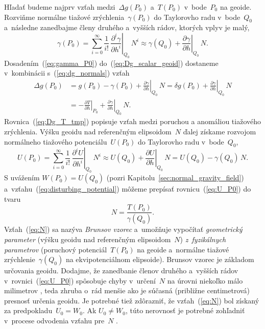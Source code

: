 \documentclass[a4paper, 12pt]{book}
\begin{document}
Hľadať budeme najprv vzťah medzi~$\Delta g(P_0)$ a~$T(P_0)$ v~bode~$P_0$ na 
geoide.  Rozviňme normálne tiažové zrýchlenia~$\gamma(P_0)$ do Taylorovho radu 
v~bode~$Q_0$ a~následne zanedbajme členy druhého a~vyšších rádov, ktorých vplyv 
je malý,
%
\begin{equation}
\label{eq:gamma_P0}
\gamma(P_0) = \sum_{i = 0}^\infty \frac{1}{i!} \, \left.\frac{\partial^i 
\gamma}{\partial h^i}\right|_{Q_0} \, N^i \approx \gamma(Q_0) 
+ \left.\frac{\partial \gamma}{\partial h}\right|_{Q_0} \, N{.}
\end{equation}
%
Dosadením~(\ref{eq:gamma_P0}) do~(\ref{eq:Dg_scalar_geoid}) dostaneme 
v~kombinácii s~(\ref{eq:dg_normals}) vzťah
%
\begin{equation}
\label{eq:Dg_T_tmp}
\begin{split}
\Delta g(P_0) &= g(P_0) - \gamma(P_0) + \left.\frac{\partial \gamma}{\partial 
h}\right|_{Q_0} \, N = \delta g(P_0) + \left.\frac{\partial \gamma}{\partial 
h}\right|_{Q_0} \, N\\
%
&=-\left.\frac{\partial T}{\partial h}\right|_{P_0} + \left.\frac{\partial 
\gamma}{\partial h}\right|_{Q_0} \, N{.}
\end{split}
\end{equation}
%
Rovnica~(\ref{eq:Dg_T_tmp}) popisuje vzťah medzi poruchou a anomáliou tiažového 
zrýchlenia.  Výšku geoidu nad referenčným elipsoidom~$N$ ďalej získame rozvojom 
normálneho tiažového potenciálu~$U(P_0)$ do Taylorovho radu v~bode~$Q_0$,
%
\begin{equation}
\label{eq:U_P0}
U(P_0) = \sum_{i = 0}^\infty \frac{1}{i!} \, \left.\frac{\partial^i U}{\partial 
h^i}\right|_{Q_0} \, N^i \approx U(Q_0) + \left.\frac{\partial U}{\partial 
h}\right|_{Q_0} \, N = U(Q_0) - \gamma(Q_0) \, N{.}
\end{equation}
%
S uvážením $W(P_0) = U(Q_0)$ (pozri Kapitolu~\ref{sec:normal_gravity_field}) 
a~vzťahu~(\ref{eq:disturbing_potential}) môžeme prepísať 
rovnicu~(\ref{eq:U_P0}) do tvaru
%
\begin{equation}
\label{eq:N}
N = \frac{T(P_0)}{\gamma(Q_0)}.
\end{equation}
%
Vzťah~(\ref{eq:N}) sa nazýva \emph{Brunsov vzorec} a~umožňuje vypočítať 
\emph{geometrický parameter} (výšku geoidu nad referenčným elipsoidom~$N$) 
\emph{z~fyzikálnych parametrov} (poruchový potenciál~$T(P_0)$ na geoide 
a~normálne tiažové zrýchlenie~$\gamma(Q_0)$ na ekvipotenciálnom elipsoide).  
Brunsov vzorec je základom určovania geoidu.  Dodajme, že zanedbanie členov 
druhého a~vyšších rádov v~rovnici~(\ref{eq:U_P0}) spôsobuje chyby v~určení~$N$ 
na úrovni niekoľko málo milimetrov \parencite{Jekeli2015,Sjoberg2017}, teda 
zhruba o~rád menšie ako je súčasná (približne centimetrová) presnosť určenia 
geoidu.  Je potrebné tiež zdôrazniť, že vzťah~(\ref{eq:N}) bol získaný za 
predpokladu~$U_0 = W_0$.  Ak $U_0 \neq W_0$, túto nerovnosť je potrebné 
zohľadniť v~procese odvodenia vzťahu pre~$N$ \parencite[pozri 
napríklad][]{VanicekGeodesy}.
\end{document}
